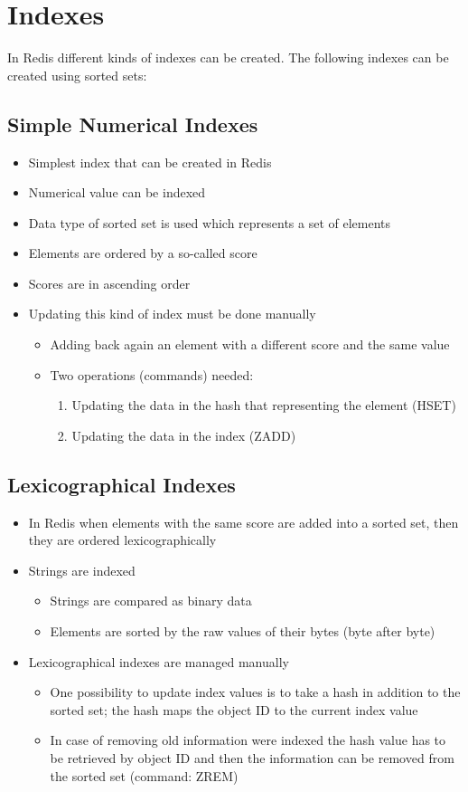 \chapter{Indexes}

In Redis different kinds of indexes can be created. The following indexes can be created using sorted sets:

\section{Simple Numerical Indexes}
\begin{itemize}
\item Simplest index that can be created in Redis
\item Numerical value can be indexed
\item Data type of sorted set is used which represents a set of elements
\item Elements are ordered by a so-called score
\item Scores are in ascending order
\item Updating this kind of index must be done manually
\begin{itemize}
\item Adding back again an element with a different score and the same value
\item Two operations (commands) needed:
\begin{enumerate}
\item Updating the data in the hash that representing the element    (HSET)
\item Updating the data in the index (ZADD)
\end{enumerate}
\end{itemize}
\end{itemize}

\section{Lexicographical Indexes}
\begin{itemize}
\item In Redis when elements with the same score are added into a sorted set, then they are ordered lexicographically
\item Strings are indexed
\begin{itemize}
\item Strings are compared as binary data
\item Elements are sorted by the raw values of their bytes (byte after byte)
\end{itemize}
\item Lexicographical indexes are managed manually
\begin{itemize}
\item One possibility to update index values is to take a hash in addition to    the sorted set; the hash maps the object ID to the current index value
\item In case of removing old information were indexed the hash value   has to be retrieved by object ID and then the information can be removed from the sorted set (command: ZREM)
\end{itemize}
\end{itemize}

